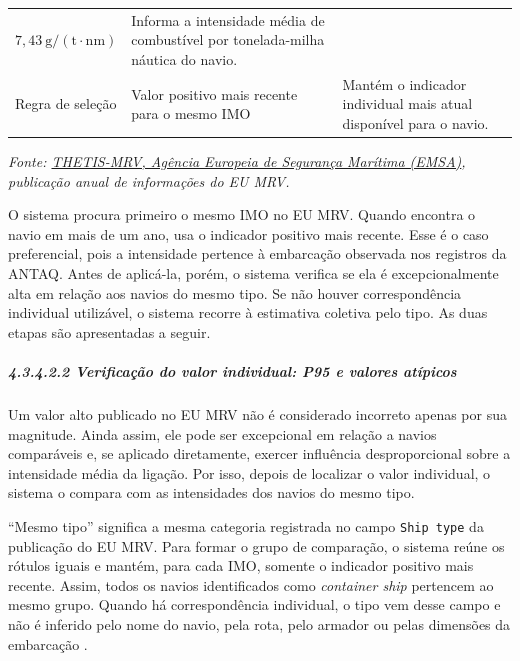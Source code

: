 \documentclass[brazil,]{article}
\let\oldsubparagraph\subparagraph
\renewcommand{\subparagraph}[1]{\Needspace{6\baselineskip}\oldsubparagraph{#1}\mbox{}}
\begin{document}
\begin{longtable}[]{@{}lll@{}}
\begin{minipage}[t]{0.30\columnwidth}
\(7{,}43\ \mathrm{g/(t\cdot nm)}\)\strut
\end{minipage} & \begin{minipage}[t]{0.30\columnwidth}\raggedright
Informa a intensidade média de combustível por tonelada-milha náutica do
navio.\strut
\end{minipage}\tabularnewline
\begin{minipage}[t]{0.30\columnwidth}\raggedright
Regra de seleção\strut
\end{minipage} & \begin{minipage}[t]{0.30\columnwidth}\raggedright
Valor positivo mais recente para o mesmo IMO\strut
\end{minipage} & \begin{minipage}[t]{0.30\columnwidth}\raggedright
Mantém o indicador individual mais atual disponível para o navio.\strut
\end{minipage}\tabularnewline
\bottomrule
\end{longtable}

\emph{Fonte: \href{https://mrv.emsa.europa.eu/}{THETIS-MRV, Agência
Europeia de Segurança Marítima (EMSA)}, publicação anual de informações
do EU MRV.}

O sistema procura primeiro o mesmo IMO no EU MRV. Quando encontra o
navio em mais de um ano, usa o indicador positivo mais recente. Esse é
o caso preferencial, pois a intensidade pertence à embarcação observada
nos registros da ANTAQ. Antes de aplicá-la, porém, o sistema verifica se
ela é excepcionalmente alta em relação aos navios do mesmo tipo. Se não
houver correspondência individual utilizável, o sistema recorre à
estimativa coletiva pelo tipo. As duas etapas são apresentadas a seguir.

\hypertarget{verificauxe7uxe3o-do-valor-individual-p95-e-valores-atuxedpicos}{%
\subparagraph{4.3.4.2.2 Verificação do valor individual: P95 e valores
atípicos}\label{verificauxe7uxe3o-do-valor-individual-p95-e-valores-atuxedpicos}}

Um valor alto publicado no EU MRV não é considerado incorreto apenas
por sua magnitude. Ainda assim, ele pode ser excepcional em relação a
navios comparáveis e, se aplicado diretamente, exercer influência
desproporcional sobre a intensidade média da ligação. Por isso, depois
de localizar o valor individual, o sistema o compara com as intensidades
dos navios do mesmo tipo.

``Mesmo tipo'' significa a mesma categoria registrada no campo
\texttt{Ship type} da publicação do EU MRV. Para formar o grupo de
comparação, o sistema reúne os rótulos iguais e mantém, para cada IMO,
somente o indicador positivo mais recente. Assim, todos os navios
identificados como \emph{container ship} pertencem ao mesmo grupo. Quando
há correspondência individual, o tipo vem desse campo e não é inferido
pelo nome do navio, pela rota, pelo armador ou pelas dimensões da
embarcação \parencite{emsa2026}.
\end{document}
